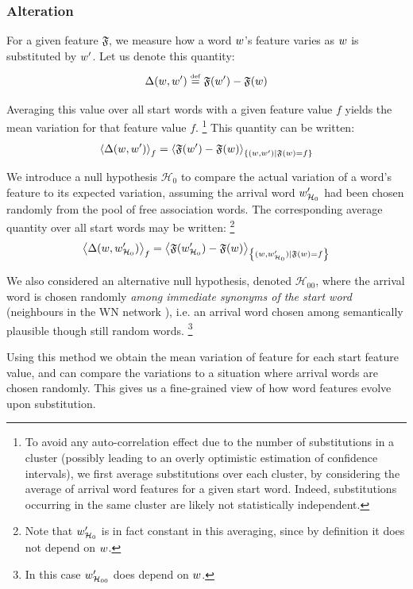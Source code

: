 \subsubsection{Alteration}

For a given feature $\mathfrak{F}$, we measure how a word $w$'s feature varies as $w$ is substituted by $w'$.
Let us denote this quantity:
$$\Delta (w,w') \overset{\underset{\mathrm{def}}{}}{=} \mathfrak{F}(w') - \mathfrak{F}(w)$$

Averaging this value over all start words with a given feature value $f$ yields the mean variation for that feature value $f$.
\footnote{To avoid any auto-correlation effect due to the number of substitutions in a cluster (possibly leading to an overly optimistic estimation of confidence intervals), we first average substitutions over each cluster, by considering the average of arrival word features for a given start word.
Indeed, substitutions occurring in the same cluster are likely not statistically independent.}
This quantity can be written:
$$\left< \Delta(w,w') \right>_f = \left< \mathfrak{F}(w') - \mathfrak{F}(w) \right>_{\left\lbrace (w,w') | \mathfrak{F}(w) = f \right\rbrace}$$

We introduce a null hypothesis $\mathcal{H}_0$ to compare the actual variation of a word's feature to its expected variation, assuming the arrival word $w'_{\mathcal{H}_0}$ had been chosen randomly from the pool of free association words.
The corresponding average quantity over all start words may be written:
\footnote{Note that $w'_{\mathcal{H}_0}$ is in fact constant in this averaging, since by definition it does not depend on $w$.}
$$\left< \Delta(w,w'_{\mathcal{H}_0}) \right>_f = \left< \mathfrak{F}({w'_{\mathcal{H}_0}}) - \mathfrak{F}(w) \right>_{\left\lbrace (w,w'_{\mathcal{H}_0}) | \mathfrak{F}(w) = f \right\rbrace}$$

We also considered an alternative null hypothesis, denoted $\mathcal{H}_{00}$, where the arrival word is chosen randomly \emph{among immediate synonyms of the start word} (neighbours in the WN network ), i.e. an arrival word chosen among semantically plausible though still random words.
\footnote{In this case $w'_{\mathcal{H}_{00}}$ does depend on $w$.}

Using this method we obtain the mean variation of feature for each start feature value, and can compare the variations to a situation where arrival words are chosen randomly.
This gives us a fine-grained view of how word features evolve upon substitution.

